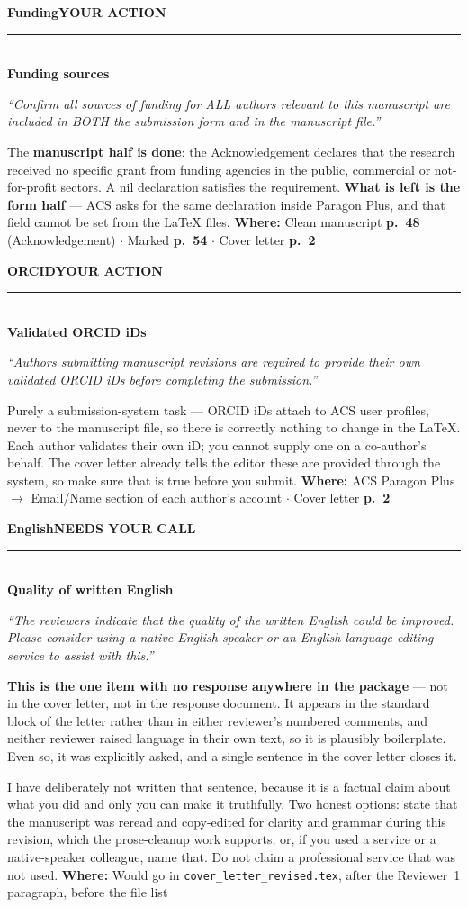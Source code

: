 \documentclass[11pt]{article}
\newcommand{\itemhead}[4]{%
  \needspace{4\baselineskip}%
  \vspace{0.5em}%
  {\bfseries\color{accent}#1}\hfill{\small\bfseries\color{#3}\MakeUppercase{#2}}\\[-0.4em]
  \textcolor{rulegrey}{\rule{\linewidth}{0.4pt}}\\[-0.2em]
  {\bfseries #4}\par\vspace{-0.15em}%
}
\newcommand{\quo}[1]{{\small\itshape\color{inkmute}``#1''}\par}
\newcommand{\where}[1]{%
  \vspace{0.15em}%
  {\small\textcolor{inkmute}{\textbf{Where:}} #1}\par
}
\begin{document}
\itemhead{Funding}{your action}{act}{Funding sources}
\quo{Confirm all sources of funding for ALL authors relevant to this manuscript are included in BOTH the submission form and in the manuscript file.}
The \textbf{manuscript half is done}: the Acknowledgement declares that the research received no specific
grant from funding agencies in the public, commercial or not-for-profit sectors. A nil declaration
satisfies the requirement. \textbf{What is left is the form half} --- ACS asks for the same declaration
inside Paragon Plus, and that field cannot be set from the \LaTeX{} files.
\where{Clean manuscript \textbf{p.~48} (Acknowledgement) $\cdot$ Marked \textbf{p.~54} $\cdot$
Cover letter \textbf{p.~2}}

\itemhead{ORCID}{your action}{act}{Validated ORCID iDs}
\quo{Authors submitting manuscript revisions are required to provide their own validated ORCID iDs before completing the submission.}
Purely a submission-system task --- ORCID iDs attach to ACS user profiles, never to the manuscript file, so
there is correctly nothing to change in the \LaTeX{}. Each author validates their own iD; you cannot supply
one on a co-author's behalf. The cover letter already tells the editor these are provided through the
system, so make sure that is true before you submit.
\where{ACS Paragon Plus $\rightarrow$ Email/Name section of each author's account $\cdot$
Cover letter \textbf{p.~2}}

\itemhead{English}{needs your call}{act}{Quality of written English}
\quo{The reviewers indicate that the quality of the written English could be improved. Please consider using a native English speaker or an English-language editing service to assist with this.}
\textbf{This is the one item with no response anywhere in the package} --- not in the cover letter, not in
the response document. It appears in the standard block of the letter rather than in either reviewer's
numbered comments, and neither reviewer raised language in their own text, so it is plausibly boilerplate.
Even so, it was explicitly asked, and a single sentence in the cover letter closes it.

I have deliberately not written that sentence, because it is a factual claim about what you did and only
you can make it truthfully. Two honest options: state that the manuscript was reread and copy-edited for
clarity and grammar during this revision, which the prose-cleanup work supports; or, if you used a service
or a native-speaker colleague, name that. Do not claim a professional service that was not used.
\where{Would go in \texttt{cover\_letter\_revised.tex}, after the Reviewer~1 paragraph, before the file list}
\end{document}
